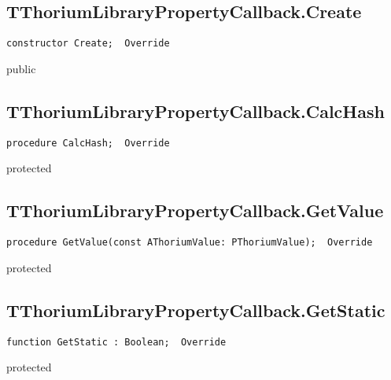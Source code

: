 \subsection{TThoriumLibraryPropertyCallback.Create}
\label{thoriumcorepkg:thorium:tthoriumlibrarypropertycallback:create}
\begin{FPCList}
\Declaration 

\begin{verbatim}
constructor Create;  Override
\end{verbatim}
\Visibility
public
\end{FPCList}
\subsection{TThoriumLibraryPropertyCallback.CalcHash}
\label{thoriumcorepkg:thorium:tthoriumlibrarypropertycallback:calchash}
\begin{FPCList}
\Declaration 

\begin{verbatim}
procedure CalcHash;  Override
\end{verbatim}
\Visibility
protected
\end{FPCList}
\subsection{TThoriumLibraryPropertyCallback.GetValue}
\label{thoriumcorepkg:thorium:tthoriumlibrarypropertycallback:getvalue}
\begin{FPCList}
\Declaration 

\begin{verbatim}
procedure GetValue(const AThoriumValue: PThoriumValue);  Override
\end{verbatim}
\Visibility
protected
\end{FPCList}
\subsection{TThoriumLibraryPropertyCallback.GetStatic}
\label{thoriumcorepkg:thorium:tthoriumlibrarypropertycallback:getstatic}
\begin{FPCList}
\Declaration 

\begin{verbatim}
function GetStatic : Boolean;  Override
\end{verbatim}
\Visibility
protected
\end{FPCList}
